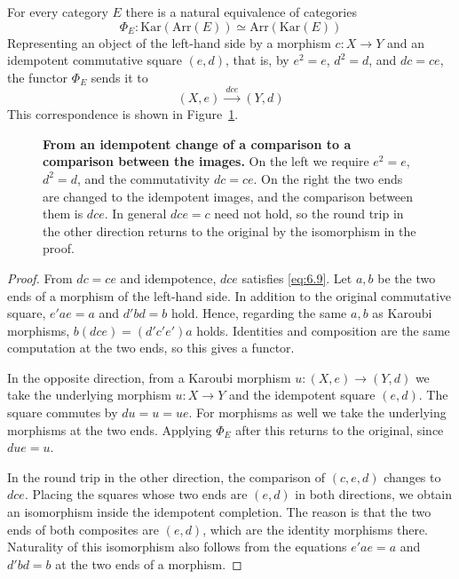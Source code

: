 \begin{theorem}\label{thm:6.27}

For every category $E$ there is a natural equivalence of categories
\begin{equation*}
\Phi_E:\mathrm{Kar}(\mathrm{Arr}(E))
\simeq\mathrm{Arr}(\mathrm{Kar}(E))
\tag{6.41}\label{eq:6.41}
\end{equation*}
Representing an object of the left-hand side by a morphism $c:X\to Y$ and an idempotent
commutative square $(e,d)$, that is, by $e^2=e$, $d^2=d$, and $dc=ce$, the functor $\Phi_E$
sends it to
\begin{equation*}
(X,e)\xrightarrow{\ dce\ }(Y,d)
\tag{6.42}\label{eq:6.42}
\end{equation*}
This correspondence is shown in Figure~\ref{fig:6.1}.

\end{theorem}

\begin{figure}[htbp]
\centering

\caption{\textbf{From an idempotent change of a comparison to a comparison between the images.}
On the left we require $e^2=e$, $d^2=d$, and the commutativity $dc=ce$.
On the right the two ends are changed to the idempotent images, and the comparison between
them is $dce$.
In general $dce=c$ need not hold, so the round trip in the other direction returns to the
original by the isomorphism in the proof.}\label{fig:6.1}
\end{figure}

\begin{proof}

From $dc=ce$ and idempotence, $dce$ satisfies \eqref{eq:6.9}.
Let $a,b$ be the two ends of a morphism of the left-hand side. In addition to the original
commutative square, $e'ae=a$ and $d'bd=b$ hold.
Hence, regarding the same $a,b$ as Karoubi morphisms,
$b(dce)=(d'c'e')a$ holds.
Identities and composition are the same computation at the two ends, so this gives a
functor.

In the opposite direction, from a Karoubi morphism $u:(X,e)\to(Y,d)$ we take the underlying
morphism $u:X\to Y$ and the idempotent square $(e,d)$. The square commutes by $du=u=ue$.
For morphisms as well we take the underlying morphisms at the two ends.
Applying $\Phi_E$ after this returns to the original, since $due=u$.

In the round trip in the other direction, the comparison of $(c,e,d)$ changes to $dce$.
Placing the squares whose two ends are $(e,d)$ in both directions, we obtain an
isomorphism inside the idempotent completion.
The reason is that the two ends of both composites are $(e,d)$, which are the identity
morphisms there.
Naturality of this isomorphism also follows from the equations $e'ae=a$ and $d'bd=b$ at the
two ends of a morphism.

\end{proof}

